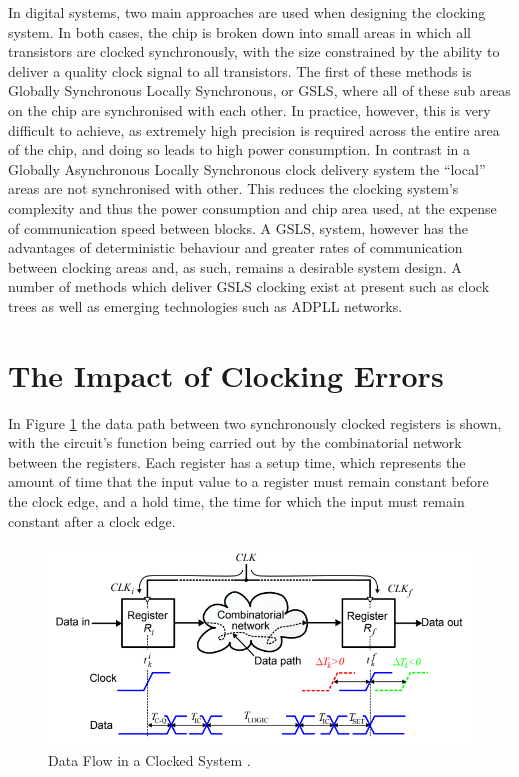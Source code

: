 \documentclass[11pt,english,british]{report}
\begin{document}
In digital systems, two main approaches are used when designing the clocking system. In both cases, the chip is broken down into small areas in which all transistors are clocked synchronously, with the size constrained by the ability to deliver a quality clock signal to all transistors. The first of these methods is Globally Synchronous Locally Synchronous, or GSLS, where all of these sub areas on the chip are synchronised with each other. In practice, however, this is very difficult to achieve, as extremely high precision is required across the entire area of the chip, and doing so leads to high power consumption.
In contrast in a Globally Asynchronous Locally Synchronous clock delivery system the ``local'' areas are not synchronised with other. This reduces the clocking system's complexity and thus the power consumption and chip area used, at the expense of communication speed between blocks. %
A GSLS, system, however has the advantages of deterministic behaviour and greater rates of communication between clocking areas and, as such, remains a desirable system design. A number of methods which deliver GSLS clocking exist at present such as clock trees as well as emerging technologies such as ADPLL networks.

\section{The Impact of Clocking Errors}
In Figure \ref{fig:eldar_why_precise_clocking} the data path between two synchronously clocked registers is shown, with the circuit's function being carried out by the combinatorial network between the registers.
Each register has a setup time, which represents the amount of time that the input value to a register must remain constant before the clock edge, and a hold time, the time for which the input must remain constant after a clock edge.
\begin{figure}[h]
	\centering
	\includegraphics[scale=0.5]{../eldar_why_precise_clocking}
	\caption{Data Flow in a Clocked System \cite{zianbetov2013phd}.}
	\label{fig:eldar_why_precise_clocking}
\end{figure}\\
\end{document}
